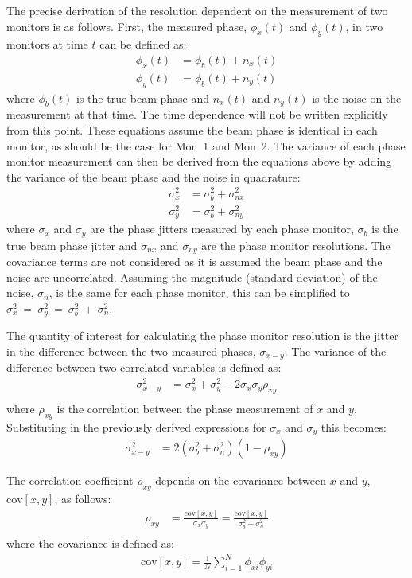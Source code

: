 The precise derivation of the resolution dependent on the measurement of two monitors is as follows. First, the measured phase, \(\phi_x(t)\) and \(\phi_y(t)\), in two monitors at time \(t\) can be defined as:
\begin{align}
\phi_x(t) &= \phi_b(t) + n_x(t) \label{e:resEq1} \\
\phi_y(t) &= \phi_b(t) + n_y(t) \label{e:resEq2}
\end{align}
where \(\phi_b(t)\) is the true beam phase and \(n_x(t)\) and \(n_y(t)\) is the noise on the measurement at that time. The time dependence will not be written explicitly from this point. These equations assume the beam phase is identical in each monitor, as should be the case for Mon~1 and Mon~2. The variance of each phase monitor measurement can then be derived from the equations above by adding the variance of the beam phase and the noise in quadrature:
\begin{align}
\sigma_x^2 &= \sigma_b^2 + \sigma_{nx}^2 \label{e:measJitWithRes} \\
\sigma_y^2 &= \sigma_b^2 + \sigma_{ny}^2
\end{align}
where \(\sigma_x\) and \(\sigma_y\) are the phase jitters measured by each phase monitor, \(\sigma_b\) is the true beam phase jitter and \(\sigma_{nx}\) and \(\sigma_{ny}\) are the phase monitor resolutions. The covariance terms are not considered as it is assumed the beam phase and the noise are uncorrelated. Assuming the magnitude (standard deviation) of the noise, \(\sigma_n\), is the same for each phase monitor, this can be simplified to \(\sigma_x^2~=~\sigma_y^2~=~\sigma_b^2~+~\sigma_n^2\).

The quantity of interest for calculating the phase monitor resolution is the jitter in the difference between the two measured phases, \(\sigma_{x-y}\). The variance of the difference between two correlated variables is defined as:
\begin{align}
\sigma_{x-y}^2 &= \sigma_x^2 + \sigma_y^2 - 2\sigma_x\sigma_y\rho_{xy} \\
\end{align}
where \(\rho_{xy}\) is the correlation between the phase measurement of \(x\) and \(y\). Substituting in the previously derived expressions for \(\sigma_x\) and \(\sigma_y\) this becomes:
\begin{align}
\sigma_{x-y}^2 &= 2(\sigma_b^2 + \sigma_n^2)(1-\rho_{xy})
\end{align}

The correlation coefficient \(\rho_{xy}\) depends on the covariance between \(x\) and \(y\), \(\mathrm{cov}[x,y]\), as follows:
\begin{align}
\rho_{xy} &= \frac{\mathrm{cov}[x,y]}{\sigma_x\sigma_y} = \frac{\mathrm{cov}[x,y]}{\sigma_b^2+\sigma_n^2} \\
\end{align}
where the covariance is defined as:
\begin{align}
\mathrm{cov}[x,y] = \frac{1}{N}\sum_{i=1}^{N}\phi_{xi}\phi_{yi} \\
\end{align}

